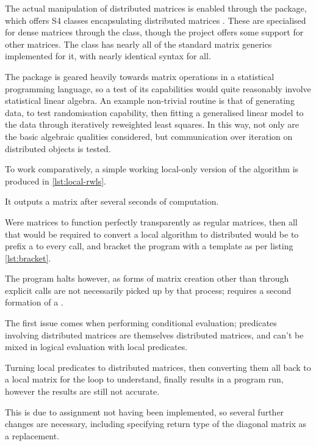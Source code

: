The actual manipulation of distributed matrices is enabled through the
 package, which offers S4 classes encapsulating distributed
matrices \cite{pbdDMATpackage}. These are specialised for dense matrices
through the  class, though the project offers some
support for other matrices. The  class has nearly all
of the standard matrix generics implemented for it, with nearly
identical syntax for all.

The package is geared heavily towards matrix operations in a statistical
programming language, so a test of its capabilities would quite
reasonably involve statistical linear algebra. An example non-trivial
routine is that of generating data, to test randomisation capability,
then fitting a generalised linear model to the data through iteratively
reweighted least squares. In this way, not only are the basic algebraic
qualities considered, but communication over iteration on distributed
objects is tested.

To work comparatively, a simple working local-only version of the
algorithm is produced in \cref{lst:local-rwls}.


It outputs a  matrix after several seconds of computation.

Were  matrices to function perfectly transparently as regular
matrices, then all that would be required to convert a local algorithm
to distributed would be to prefix a  to every  call, and bracket the program with a template as per listing
\cref{lst:bracket}.


The program halts however, as forms of matrix creation other than
through explicit  calls
are not necessarily picked up by that process;  requires a
second formation of a .

The first issue comes when performing conditional evaluation; predicates
involving distributed matrices are themselves distributed matrices, and
can't be mixed in logical evaluation with local predicates.

Turning local predicates to distributed matrices, then converting them
all back to a local matrix for the loop to understand, finally results
in a program run, however the results are still not accurate.

This is due to 
assignment not having been implemented, so several further changes are
necessary, including specifying return type of the diagonal matrix as a
replacement.

